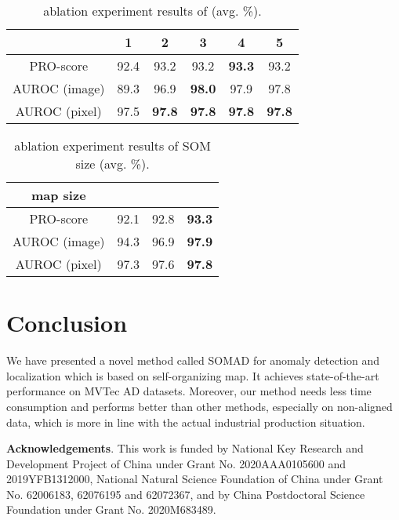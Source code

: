 \documentclass{article}
\begin{document}
\begin{table}[htbp]
\footnotesize
	\centering
	\caption{ablation experiment results of  (avg. \%).}
	\label{ablation_k}
	\begin{tabular}{c|c|c|c|c|c}
	    \hline
		     & 1 & 2 & 3 & 4 & 5 \\
		\hline
		PRO-score & 92.4 & 93.2  & 93.2  & \textbf{93.3} & 93.2 \\
		AUROC (image) & 89.3 & 96.9 & \textbf{98.0} & 97.9 & 97.8 \\
		AUROC (pixel) & 97.5 & \textbf{97.8} & \textbf{97.8} & \textbf{97.8} & \textbf{97.8} \\
		\hline
	\end{tabular}
\end{table}
\begin{table}[hbtp]
\footnotesize
	\centering
	\caption{ablation experiment results of SOM size (avg. \%).}
	\label{tab:ablation_mapsize}
	\begin{tabular}{c|c|c|c}
	    \hline
		map size  &  &  &  \\
		\hline
		PRO-score    & 92.1  & 92.8      & \textbf{93.3}      \\
		AUROC (image) & 94.3  & 96.9      & \textbf{97.9}      \\
		AUROC (pixel) & 97.3  & 97.6      & \textbf{97.8}      \\
		\hline
	\end{tabular}
\end{table}

\section{Conclusion}
\label{sec:conclusion}
We have presented a novel method called SOMAD for anomaly detection and localization which is based on self-organizing map. It achieves state-of-the-art performance on MVTec AD datasets. Moreover, our method needs less time consumption and performs better than other methods, especially on non-aligned data, which is more in line with the actual industrial production situation.

{\flushleft\textbf{Acknowledgements}.} This work is funded by National Key Research and Development Project of China under Grant No. 2020AAA0105600 and 2019YFB1312000, National Natural Science Foundation of China under Grant No. 62006183, 62076195 and 62072367, and by China Postdoctoral Science Foundation under Grant No. 2020M683489.

\newpage


\vfill
\pagebreak
\end{document}
